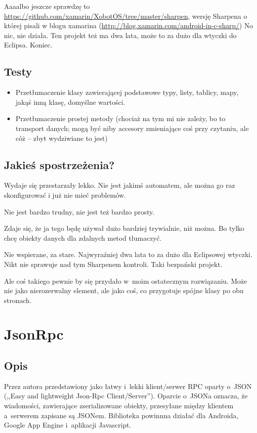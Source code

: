Aaaalbo jeszcze sprawdzę to \url{https://github.com/xamarin/XobotOS/tree/master/sharpen}, wersję Sharpena o której pisali w blogu xamarina (\url{http://blog.xamarin.com/android-in-c-sharp/})
No nic, nie działa. Ten projekt też ma dwa lata, może to za dużo dla wtyczki do Eclipsa. Koniec.

\subsection{Testy}
\begin{itemize}
	\item Przetłumaczenie klasy zawierającej podstawowe typy, listy, tablicy, mapy, jakąś inną klasę, domyślne wartości.
	\item Przetłumaczenie prostej metody (chociaż na tym mi nie zależy, bo to transport danych; mogą być niby accesory zmieniające coś przy czytaniu, ale cóż -- zbyt wydziwiane to jest)
\end{itemize}

\subsection{Jakieś spostrzeżenia?}
Wydaje się przestarzały lekko. Nie jest jakimś automatem, ale można go raz skonfigurować i już nie mieć problemów.

Nie jest bardzo trudny, nie jest też bardzo prosty.

Zdaje się, że ja tego będę używał dużo bardziej trywialnie, niż można. Bo tylko chcę obiekty danych dla zdalnych metod tłumaczyć.

Nie wspierane, za stare. Najwyraźniej dwa lata to za dużo dla Eclipsowej wtyczki. Nikt nie sprawuje nad tym Sharpenem kontroli. Taki bezpański projekt.

Ale coś takiego pewnie by się przydało w~moim ostatecznym rozwiązaniu. Może nie jako nierozerwalny element, ale jako coś, co przygotuje spójne klasy po obu stronach.


\section{JsonRpc}
\subsection{Opis}
Przez autora przedstawiony jako łatwy i~lekki klient/serwer RPC oparty o~JSON (,,Easy and lightweight Json-Rpc Client/Server'')\cite{json-rpc}.
Oparcie o~JSONa oznacza, że wiadomości, zawierające zserializowane obiekty, przesyłane między klientem a~serwerem zapisane są JSONem. Biblioteka powinnna działać dla Androida, Google App Engine i~aplikacji Javascript.

